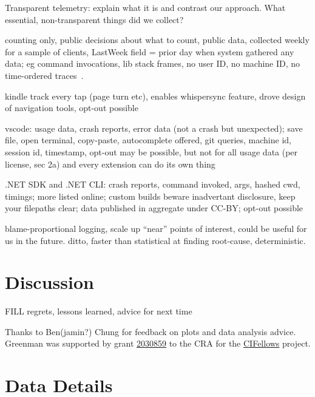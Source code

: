 \documentclass[english,submission,cleveref]{programming}
\begin{document}
Transparent telemetry: explain what it is and contrast our approach.
What essential, non-transparent things did we collect?

counting only, public decisions about what to count, public data,
collected weekly for a sample of clients, LastWeek field = prior day when
system gathered any data;
eg command invocations, lib stack frames, 
no user ID, no machine ID,
no time-ordered traces~\cite{transparent-telemetry}.

kindle track every tap (page turn etc),
enables whispersync feature,
drove design of navigation tools,
opt-out possible~\cite{kindle-telemetry}

vscode: usage data, crash reports, error data (not a crash but unexpected);
save file, open terminal, copy-paste, autocomplete offered, git queries, machine id,
session id, timestamp,
opt-out may be possible, but not for all usage data (per license, sec 2a) and
every extension can do its own thing~\cite{vscode-telemetry}

.NET SDK and .NET CLI:
crash reports, command invoked, args, hashed cwd, timings;
more listed online;
custom builds beware inadvertant disclosure, keep your filepaths clear;
data published in aggregate under CC-BY;
opt-out possible~\cite{dotnet-telemetry}


\cite{lnsmc-usenix-2018} blame-proportional logging,
scale up ``near'' points of interest,
could be useful for us in the future.
\cite{fnm-sigmod-2020} ditto, faster than statistical at finding root-cause,
deterministic.



\section{Discussion}
\label{s:conclusion}
\label{s:discussion}

FILL regrets, lessons learned, advice for next time



\acks

Thanks to Ben(jamin?) Chung for feedback on plots and data analysis advice.
Greenman was supported by
grant \href{https://nsf.gov/awardsearch/showAward?AWD_ID=2030859&HistoricalAwards=false}{2030859}
to the CRA for the \href{https://cifellows2020.org}{CIFellows} project.

\newpage

\appendix

\section{Data Details}
\end{document}
